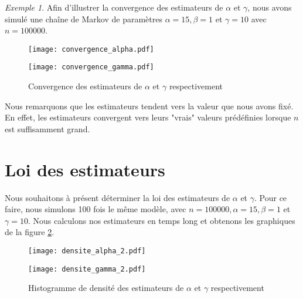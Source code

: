 \documentclass[12pt,a4paper]{report}
\theoremstyle{remark}
\newtheorem*{example}{Exemple}
\begin{document}
\begin{example}\label{exemple_convergence}
Afin d'illustrer la convergence des estimateurs de $\alpha$ et $\gamma$, nous avons simulé une chaîne de Markov de paramètres $\alpha =15, \beta = 1$ et $\gamma =10$ avec $n=100 000$.

\begin{figure}[h]
 \begin{minipage}[c]{0.25\linewidth}
        \centering
        \texttt{[image: convergence\_alpha.pdf]}
    \end{minipage}
    \hfill%
    \vspace{0.1cm}
    \begin{minipage}[c]{0.50\linewidth}
        \centering
       \texttt{[image: convergence\_gamma.pdf]}
    \end{minipage}
    \caption{Convergence des estimateurs de $\alpha$ et $\gamma$ respectivement}
    \label{convergence}
\end{figure}

Nous remarquons que les estimateurs tendent vers la valeur que nous avons fixé. En effet, les estimateurs convergent vers leurs "vrais" valeurs prédéfinies lorsque $n$ est suffisamment grand.
\end{example}

\newpage
\section{Loi des estimateurs}
\vspace{0.6cm}

Nous souhaitons à présent déterminer la loi des estimateurs de $\alpha$ et $\gamma$.
Pour ce faire, nous simulons 100 fois le même modèle, avec $n=100 000, \alpha=15, \beta=1$ et $\gamma=10$. Nous calculons nos estimateurs en temps long et obtenons les graphiques de la figure \ref{hist}.

\begin{figure}[h]
 \begin{minipage}[c]{0.25\linewidth}
        \centering
        \texttt{[image: densite\_alpha\_2.pdf]}
    \end{minipage}
    \hfill%
    \vspace{0.1cm}
    \begin{minipage}[c]{0.50\linewidth}
        \centering
       \texttt{[image: densite\_gamma\_2.pdf]}
    \end{minipage}
    \caption{Histogramme de densité des estimateurs de $\alpha$ et $\gamma$ respectivement}
    \label{hist}
\end{figure}
\end{document}
